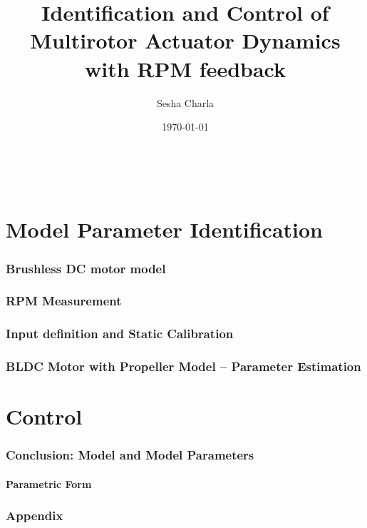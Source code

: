 \documentclass[letterpaper, 11pt]{article}
\title{Identification and Control of Multirotor Actuator Dynamics with RPM feedback}
\author{Sesha Charla}
\date{\today}
\begin{document}
\maketitle
\tableofcontents
\newpage
\
\newpage
\part{Model Parameter Identification}
\section{Brushless DC motor model}



\newpage
\section{RPM Measurement}

\newpage
\section{Input definition and Static Calibration}


\newpage
\section{BLDC Motor with Propeller Model -- Parameter Estimation}


%

\newpage
\part{Control}
\newpage
\section{Conclusion: Model and Model Parameters}
\subsection{Parametric Form}

\newpage
\section{Appendix}


\newpage


\end{document}
